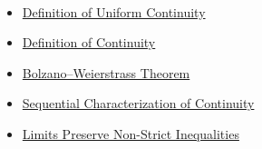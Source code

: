 \begin{remark*}[Dependencies]~\\
\begin{itemize}
  \item \hyperref[def:uniform-continuity]{Definition of Uniform Continuity}
  \item \hyperref[def:continuity]{Definition of Continuity}
  \item \hyperref[thm:bolzano-weierstrass]{Bolzano--Weierstrass Theorem}
  \item \hyperref[thm:sequential-continuity]{Sequential Characterization of Continuity}
  \item \hyperref[thm:limits-preserve-inequalities]{Limits Preserve Non-Strict Inequalities}
\end{itemize}
\end{remark*}
